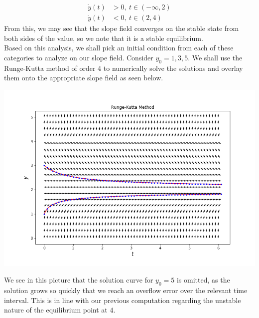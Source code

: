 \documentclass[letterpaper,10pt]{article}
\begin{document}
\begin{description}
\begin{align*}
\dot{y}(t)&>0,\ t\in(-\infty,2)\\
\dot{y}(t)&<0,\ t\in(2,4)
\end{align*}
From this, we may see that the slope field converges on the stable state from both sides of the value, so we note that it is a stable equilibrium.\\
Based on this analysis, we shall pick an initial condition from each of these categories to analyze on our slope field. Consider $y_0=1,3,5$. We shall use the Runge-Kutta method of order 4 to numerically solve the solutions and overlay them onto the appropriate slope field as seen below.
\begin{center}
\includegraphics[scale=.7]{runge.png}
\end{center}
We see in this picture that the solution curve for $y_0=5$ is omitted, as the solution grows so quickly that we reach an overflow error over the relevant time interval. This is in line with our previous computation regarding the unstable nature of the equilibrium point at $4$.
\end{description}
\end{document}
